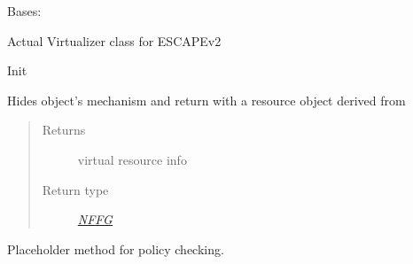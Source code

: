 \documentclass[letterpaper,10pt,english]{sphinxmanual}
\begin{document}
\begin{fulllineitems}
\label{orchest/virtualization_mgmt:escape.orchest.virtualization_mgmt.ESCAPEVirtualizer}
Bases: {\hyperref[orchest/virtualization_mgmt:escape.orchest.virtualization_mgmt.AbstractVirtualizer]{\emph{}}}

Actual Virtualizer class for ESCAPEv2

\begin{fulllineitems}
\label{orchest/virtualization_mgmt:escape.orchest.virtualization_mgmt.ESCAPEVirtualizer.__init__}
Init

\end{fulllineitems}


\begin{fulllineitems}
\label{orchest/virtualization_mgmt:escape.orchest.virtualization_mgmt.ESCAPEVirtualizer.get_resource_info}
Hides object's mechanism and return with a resource object derived from
{\hyperref[util/nffg:escape.util.nffg.NFFG]{\emph{}}}
\begin{quote}\begin{description}
\item[{Returns}] \leavevmode
virtual resource info

\item[{Return type}] \leavevmode
{\hyperref[util/nffg:escape.util.nffg.NFFG]{\emph{NFFG}}}

\end{description}\end{quote}

\end{fulllineitems}


\begin{fulllineitems}
\label{orchest/virtualization_mgmt:escape.orchest.virtualization_mgmt.ESCAPEVirtualizer.sanity_check}
Placeholder method for policy checking.


\end{fulllineitems}
\end{fulllineitems}
\end{document}
